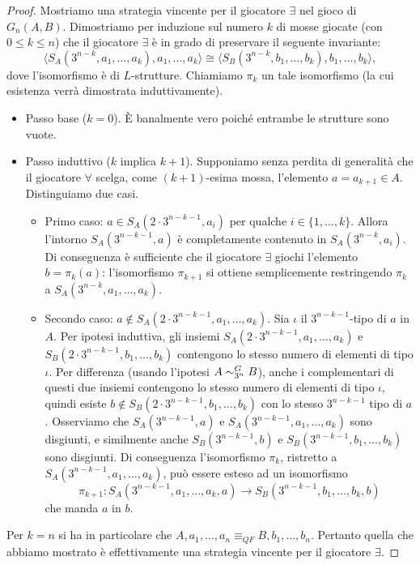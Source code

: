 \begin{proof}
  Mostriamo una strategia vincente per il giocatore $\exists$ nel gioco di \EFl\ $G_n(A,B)$.
  Dimostriamo per induzione sul numero $k$ di mosse giocate (con $0\leq k \leq n$) che il giocatore $\exists$ è in grado di preservare il seguente invariante:
  \[ \big\langle S_A(3^{n-k}, a_1,\ldots, a_k), a_1,\ldots,a_k \big\rangle \cong \big\langle S_B(3^{n-k}, b_1,\ldots, b_k), b_1,\ldots,b_k \big\rangle, \]
  dove l'isomorfismo è di $L$-strutture.
  Chiamiamo $\pi_k$ un tale isomorfismo (la cui esistenza verrà dimostrata induttivamente).
  \begin{itemize}
    \item Passo base ($k=0$). È banalmente vero poiché entrambe le strutture sono vuote.
    \item Passo induttivo ($k$ implica $k+1$). Supponiamo senza perdita di generalità che il giocatore $\forall$ scelga, come $(k+1)$-esima mossa, l'elemento $a=a_{k+1}\in A$.
    Distinguiamo due casi.
    \begin{itemize}
      \item Primo caso: $a\in S_A(2\cdot 3^{n-k-1}, a_i)$ per qualche $i\in\{1,\dots,k\}$. Allora l'intorno $S_A(3^{n-k-1},a)$ è completamente contenuto in $S_A(3^{n-k}, a_i)$.
      Di conseguenza è sufficiente che il giocatore $\exists$ giochi l'elemento $b=\pi_k(a)$: l'isomorfismo $\pi_{k+1}$ si ottiene semplicemente restringendo $\pi_k$ a $S_A(3^{n-k}, a_1,\ldots, a_k)$.
      
      \item Secondo caso: $a\not\in S_A(2\cdot 3^{n-k-1}, a_1,\ldots, a_k)$.
      Sia $\iota$ il $3^{n-k-1}$-tipo di $a$ in $A$.
      Per ipotesi induttiva, gli insiemi $S_A(2\cdot 3^{n-k-1}, a_1,\ldots, a_k)$ e $S_B(2\cdot 3^{n-k-1}, b_1,\dots,b_k)$ contengono lo stesso numero di elementi di tipo $\iota$.
      Per differenza (usando l'ipotesi $A\sim^{G}_{3^n} B$), anche i complementari di questi due insiemi contengono lo stesso numero di elementi di tipo $\iota$,
      quindi esiste $b\not\in S_B(2\cdot 3^{n-k-1}, b_1,\dots,b_k)$ con lo stesso $3^{n-k-1}$ tipo di $a$.
      Osserviamo che $S_A(3^{n-k-1}, a)$ e $S_A(3^{n-k-1}, a_1,\ldots, a_k)$ sono disgiunti, e similmente anche $S_B(3^{n-k-1}, b)$ e $S_B(3^{n-k-1}, b_1,\ldots, b_k)$ sono disgiunti.
      Di conseguenza l'isomorfismo $\pi_k$, ristretto a $S_A(3^{n-k-1}, a_1,\ldots, a_k)$, può essere esteso ad un isomorfismo
      \[ \pi_{k+1}\colon S_A(3^{n-k-1}, a_1,\ldots, a_k,a) \to S_B(3^{n-k-1}, b_1,\ldots, b_k, b) \]
      che manda $a$ in $b$.
    \end{itemize}
  \end{itemize}
  Per $k=n$ si ha in particolare che $A,a_1,\dots,a_n \equiv_{QF} B, b_1,\dots,b_n$. Pertanto quella che abbiamo mostrato è effettivamente una strategia vincente per il giocatore $\exists$.
\end{proof}


